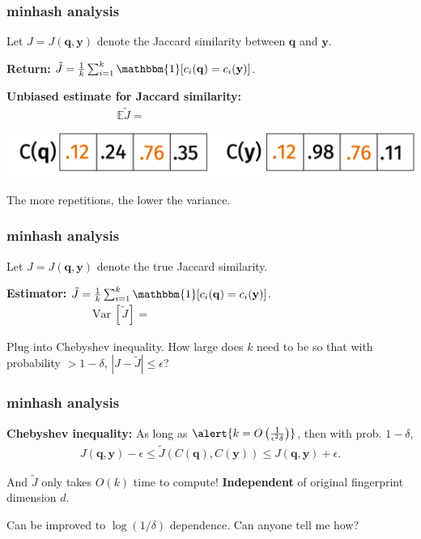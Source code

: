 \documentclass[compress]{beamer}
\newcommand{\bv}[1]{\mathbf{#1}}
\newcommand{\E}{\mathbb{E}}
\DeclareMathOperator{\Var}{Var}
\begin{document}
\begin{frame}
	\frametitle{minhash analysis}
	Let $J = J(\bv{q},\bv{y})$ denote the Jaccard similarity between $\bv{q}$ and $\bv{y}$. \vspace{1em}
	
	\textbf{Return:} $\tilde{J} = \frac{1}{k} \sum_{i=1}^k \mathbbm{1}[c_i(\bv{q}) = c_i(\bv{y})]$. 
	
	\textbf{Unbiased estimate for Jaccard similarity:}
	\begin{align*}
		\E \tilde{J} = \hspace{14em}
	\end{align*}
	
	\begin{center}
		\includegraphics[width=.6\textwidth]{minHashCompare.png}
	\end{center}
	The more repetitions, the lower the variance. 
\end{frame}

\begin{frame}[t]
	\frametitle{minhash analysis}
	Let $J = J(\bv{q},\bv{y})$ denote the true Jaccard similarity.
	
	\textbf{Estimator:} $\tilde{J} = \frac{1}{k} \sum_{i=1}^k \mathbbm{1}[c_i(\bv{q}) = c_i(\bv{y})]$. 
	\begin{align*}
		\Var [\tilde{J}] =\hspace{16em}
	\end{align*}
	
	Plug into Chebyshev inequality. How large does $k$ need to be so that with probability $> 1 - \delta$, $|J-\tilde{J}| \leq \epsilon$?
\end{frame}

\begin{frame}
	\frametitle{minhash analysis}
	\textbf{Chebyshev inequality:} As long as $\alert{{k = O\left(\frac{1}{\epsilon^2\delta}\right)}}$, then with prob. $1-\delta$,
	\begin{align*}
		J(\bv{q}, \bv{y}) -\epsilon \leq \tilde{J}\left(C(\bv{q}),C(\bv{y})\right)   \leq J(\bv{q}, \bv{y}) + \epsilon. 
	\end{align*}
	\begin{center}
		And $\tilde{J}$ only takes $O(k)$ time to compute! \alert{\textbf{Independent}} of original fingerprint dimension $d$.
	\end{center}	
	
	Can be improved to $\log(1/\delta)$ dependence. Can anyone tell me how?
\end{frame}
\end{document}

